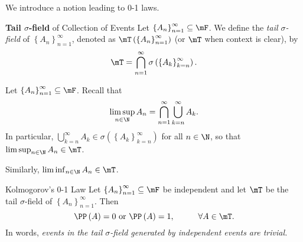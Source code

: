 \documentclass[stat901]{subfiles}
\begin{document}
    \rruleline

    \np We introduce a notion leading to 0-1 laws.

    \begin{definition}{\textbf{Tail $\sigma$-field} of Collection of Events}
        Let $\left\lbrace A_n \right\rbrace^{\infty}_{n=1}\subseteq\mF$. We define the \emph{tail $\sigma$-field} of $\left\lbrace A_n \right\rbrace^{\infty}_{n=1}$, denoted as $\mT\left( \left\lbrace A_n \right\rbrace^{\infty}_{n=1} \right)$ (or $\mT$ when context is clear), by
        \begin{equation*}
            \mT = \bigcap^{\infty}_{n=1} \sigma\left( \left\lbrace A_k \right\rbrace^{\infty}_{k=n} \right).
        \end{equation*}
    \end{definition}
        
    \begin{example}{}
        Let $\left\lbrace A_n \right\rbrace^{\infty}_{n=1}\subseteq\mF$. Recall that
        \begin{equation*}
            \limsup_{n\in\N} A_n = \bigcap^{\infty}_{n=1}\bigcup^{\infty}_{k=n} A_k.
        \end{equation*}
        In particular, $\bigcup^{\infty}_{k=n}A_k\in \sigma\left( \left\lbrace A_k \right\rbrace^{\infty}_{k=n} \right)$ for all $n\in\N$, so that $\limsup_{n\in\N} A_n\in\mT$.

        Similarly, $\liminf_{n\in\N}A_n\in\mT$.
    \end{example}

    \rruleline

    \begin{theorem}{Kolmogorov's 0-1 Law}
        Let $\left\lbrace A_n \right\rbrace^{\infty}_{n=1}\subseteq\mF$ be independent and let $\mT$ be the tail $\sigma$-field of $\left\lbrace A_n \right\rbrace^{\infty}_{n=1}$. Then
        \begin{equation*}
            \PP\left( A \right) = 0 \text{ or } \PP\left( A \right) = 1,\hspace{1cm}\forall A\in\mT.
        \end{equation*}
        In words, \textit{events in the tail $\sigma$-field generated by independent events are trivial.}
    \end{theorem}
\end{document}
